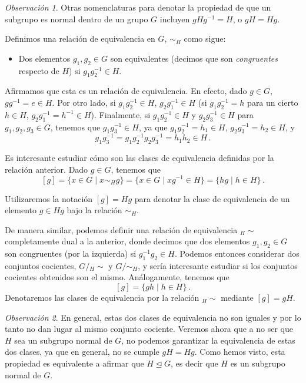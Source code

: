 \documentclass[a4paper,11pt]{amsart}
\theoremstyle{plain}
\theoremstyle{definition}
\theoremstyle{remark}
\newtheorem*{rem}{Observación}
\begin{document}
\begin{rem}
Otras nomenclaturas para denotar la propiedad de que un subgrupo es normal dentro de un grupo $G$ incluyen $gHg^{-1} = H$, o $gH = Hg$.
\end{rem}

Definimos una relación de equivalencia en $G$, $\sim_H$ como sigue: 
\begin{itemize}
    \item Dos elementos $g_1, g_2 \in G$ son equivalentes (decimos que son \textit{congruentes} respecto de $H$) si $g_1g_2^{-1} \in H$.
\end{itemize}


Afirmamos que esta es un relación de equivalencia. En efecto, dado $g \in G$, $g g ^{-1} = e \in H$. Por otro lado, si $g_1 g_2^{-1} \in H$, $g_2 g_1^{-1} \in H$ (si $g_1 g_2^{-1} = h$ para un cierto $h \in H$, $g_2 g_1^{-1} = h^{-1} \in H$). Finalmente, si $g_1g_2^{-1} \in H$ y $g_2g_3^{-1} \in H$ para $g_1, g_2, g_3 \in G$, tenemos que $g_1g_3^{-1} \in H$, ya que $g_1g_2^{-1} = h_1 \in H$, $g_2g_3^{-1} = h_2 \in H$, y 
\[ g_1g_3^{-1} = g_1g_2^{-1}g_2g_3^{-1} = h_1 h_2 \in H \, .\] 


Es interesante estudiar cómo son las clases de equivalencia definidas por la relación anterior. Dado $g \in G$, tenemos que 
\[ [g]  = \{x \in G \mid x \sim_H g \}= \{ x \in G \mid xg^{-1} \in H \} = \{ hg \mid h \in H \} \, .\] 

Utilizaremos la notación $[g] = Hg$ para denotar la clase de equivalencia de un elemento $g \in Hg$ bajo la relación $\sim_H$.

De manera similar, podemos definir una relación de equivalencia ${}_H\sim$ completamente dual a la anterior, donde decimos que dos elementos $g_1, g_2 \in G$ son congruentes (por la izquierda) si $g_1^{-1} g_2 \in H$. Podemos entonces considerar dos conjuntos cocientes, $G/{}_H \sim$ y $G/\sim_H$, y sería interesante estudiar si los conjuntos cocientes obtenidos son el mismo. Análogamente, tenemos que 
\[ [g]  = \{ gh \mid h \in H \}\, . \]
Denotaremos las clases de equivalencia por la relación ${}_H \sim$ mediante $[g] = gH$.

\begin{rem}
En general, estas dos clases de equivalencia no son iguales y por lo tanto no dan lugar al mismo conjunto cociente. Veremos ahora que a no ser que $H$ sea un subgrupo normal de $G$, no podemos garantizar la equivalencia de estas dos clases, ya que en general, no se cumple $gH = Hg$. Como hemos visto, esta propiedad es equivalente a afirmar que $H \trianglelefteq G$, es decir que $H$ es un subgrupo normal de $G$. 
\end{rem}
\end{document}
